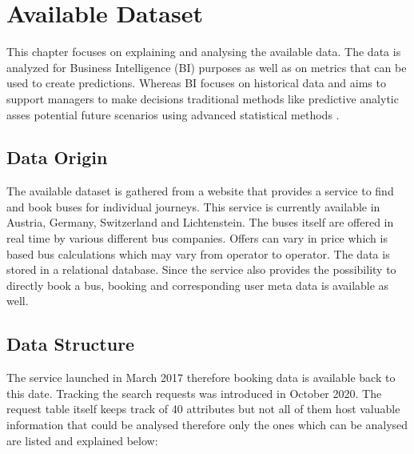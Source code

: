 %
%
% 
% 
% 

\chapter{Available Dataset}
\label{chap:introduction}
This chapter focuses on explaining and analysing the available data. The data is analyzed for Business Intelligence (BI) purposes as well as on metrics that can be used to create predictions. Whereas BI \cite{9325610} focuses on historical data and aims to support managers to make decisions traditional methods like predictive analytic asses potential future scenarios using advanced statistical methods \cite{9671997}.

\section{Data Origin}
The available dataset is gathered from a website that provides a service to find and book buses for individual journeys. This service is currently available in Austria, Germany, Switzerland and Lichtenstein. The buses itself are offered in real time by various different bus companies. Offers can vary in price which is based bus calculations which may vary from operator to operator. The data is stored in a relational database. Since the service also provides the possibility to directly book a bus, booking and corresponding user meta data is available as well. \newline




\section{Data Structure}
The service launched in March 2017 therefore booking data is available back to this date. Tracking the search requests was introduced in October 2020. 
The request table itself keeps track of 40 attributes but not all of them host valuable information that could be analysed therefore only the ones which can be analysed are listed and explained below:

